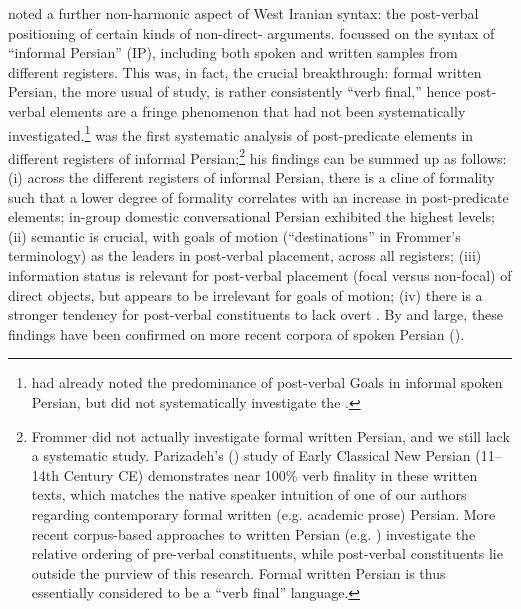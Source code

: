 \documentclass[output=paper,colorlinks,citecolor=brown,collectionchapter]{langscibook}
\begin{document}
\citet{frommer_post-verbal_1981} noted a further non-harmonic aspect of West Iranian syntax: the post-verbal positioning of certain kinds of non-direct- arguments. \citet{frommer_post-verbal_1981} focussed on the syntax of ``informal Persian'' (IP), including both spoken and written samples from different registers. This was, in fact, the crucial breakthrough: formal written Persian, the more usual  of study, is rather consistently ``verb final,'' hence post-verbal elements are a fringe phenomenon that had not been systematically investigated.\footnote{\citet{Lazard1957Persian} had already noted the predominance of post-verbal Goals in informal spoken Persian, but did not systematically investigate the .} \citet{frommer_post-verbal_1981} was the first systematic analysis of post-predicate elements in different registers of informal Persian;\footnote{Frommer did not actually investigate formal written Persian, and we still lack a systematic study. Parizadeh's () study of Early Classical New Persian (11--14th Century CE) demonstrates near 100\% verb finality in these written texts, which matches the native speaker intuition of one of our authors regarding contemporary formal written (e.g. academic prose) Persian. More recent corpus-based approaches to written Persian (e.g. \citealt{Faghirietal2018Canonical}) investigate the relative ordering of pre-verbal constituents, while post-verbal constituents lie outside the purview of this research. Formal written Persian is thus essentially considered to be a ``verb final'' language.} his findings can be summed up as follows: (i) across the different registers of informal Persian, there is a cline of formality such that a lower degree of formality correlates with an increase in post-predicate elements; in-group domestic conversational Persian exhibited the highest levels; (ii) semantic  is crucial, with goals of motion (``destinations'' in Frommer's terminology) as the leaders in post-verbal placement, across all registers; (iii) information status is relevant for post-verbal placement (focal versus non-focal) of direct objects, but appears to be irrelevant for goals of motion; (iv) there is a stronger tendency for post-verbal constituents to lack overt . By and large, these findings have been confirmed on more recent corpora of spoken Persian ().
\end{document}
